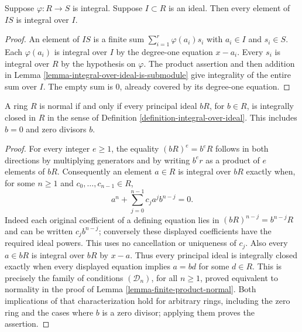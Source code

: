 \begin{lemma}
\label{lemma-integral-integral-over-ideal}
Suppose $\varphi : R \to S$ is integral.
Suppose $I \subset R$ is an ideal.
Then every element of $IS$ is integral over $I$.
\end{lemma}

\begin{proof}
An element of $IS$ is a finite sum
$\sum_{i=1}^r\varphi(a_i)s_i$ with $a_i\in I$ and $s_i\in S$.
Each $\varphi(a_i)$ is integral over $I$ by the degree-one
equation $x-a_i$. Every $s_i$ is integral over $R$ by the
hypothesis on $\varphi$. The product assertion and then addition
in Lemma \ref{lemma-integral-over-ideal-is-submodule} give
integrality of the entire sum over $I$. The empty sum is $0$,
already covered by its degree-one equation.
\end{proof}

\begin{lemma}
\label{lemma-normal-principal-ideals-integrally-closed}
A ring $R$ is normal if and only if every principal ideal
$bR$, for $b\in R$, is integrally closed in $R$ in the sense
of Definition \ref{definition-integral-over-ideal}.
This includes $b=0$ and zero divisors $b$.
\end{lemma}

\begin{proof}
For every integer $e\geq1$, the equality $(bR)^e=b^eR$
follows in both directions by multiplying generators and by
writing $b^er$ as a product of $e$ elements of $bR$.
Consequently an element $a\in R$ is integral over $bR$ exactly
when, for some $n\geq1$ and $c_0,\ldots,c_{n-1}\in R$,
$$
a^n+\sum_{j=0}^{n-1}c_ja^jb^{n-j}=0.
$$
Indeed each original coefficient of a defining equation lies in
$(bR)^{n-j}=b^{n-j}R$ and can be written $c_jb^{n-j}$;
conversely these displayed coefficients have the required ideal
powers. This uses no cancellation or uniqueness of $c_j$.
Also every $a\in bR$ is integral over $bR$ by $x-a$.
Thus every principal ideal is integrally closed exactly when
every displayed equation implies $a=bd$ for some $d\in R$.
This is precisely the family of conditions $(\mathcal D_n)$,
for all $n\geq1$, proved equivalent to normality in the proof of
Lemma \ref{lemma-finite-product-normal}. Both implications of
that characterization hold for arbitrary rings, including the
zero ring and the cases where $b$ is a zero divisor; applying
them proves the assertion.
\end{proof}